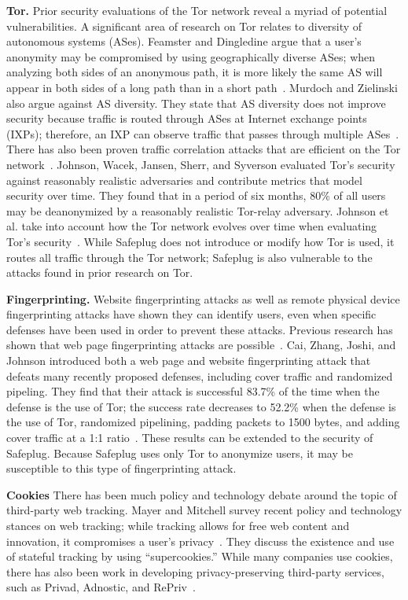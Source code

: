 \documentclass[conference]{IEEEtran}
\begin{document}
{\bf Tor.} Prior security evaluations of the Tor network reveal a myriad of potential vulnerabilities.  A significant area of research on Tor relates to diversity of autonomous systems (ASes).  Feamster and Dingledine argue that a user's anonymity may be compromised by using geographically diverse ASes; when analyzing both sides of an anonymous path, it is more likely the same AS will appear in both sides of a long path than in a short path~\cite{feamster}.  Murdoch and Zielinski also argue against AS diversity.  They state that AS diversity does not improve security because traffic is routed through ASes at Internet exchange points (IXPs); therefore, an IXP can observe traffic that passes through multiple ASes~\cite{murdoch2}.  There has also been proven traffic correlation attacks that are efficient on the Tor network~\cite{murdoch, overlier}.  Johnson, Wacek, Jansen, Sherr, and Syverson evaluated Tor's security against reasonably realistic adversaries and contribute metrics that model security over time.  They found that in a period of six months, 80\% of all users may be deanonymized by a reasonably realistic Tor-relay adversary.  Johnson et al. take into account how the Tor network evolves over time when evaluating Tor's security~\cite{tor2}.  While Safeplug does not introduce or modify how Tor is used, it routes all traffic through the Tor network; Safeplug is also vulnerable to the attacks found in prior research on Tor.  

{\bf Fingerprinting.}  Website fingerprinting attacks as well as remote physical device fingerprinting attacks have shown they can identify users, even when specific defenses have been used in order to prevent these attacks. Previous research has shown that web page fingerprinting attacks are possible~\cite{dyer, herrmann, panchenko}.  Cai, Zhang, Joshi, and Johnson introduced both a web page and website fingerprinting attack that defeats many recently proposed defenses, including cover traffic and randomized pipeling.  They find that their attack is successful 83.7\% of the time when the defense is the use of Tor; the success rate decreases to 52.2\% when the defense is the use of Tor, randomized pipelining, padding packets to 1500 bytes, and adding cover traffic at a 1:1 ratio~\cite{fingerprint1}.  These results can be extended to the security of Safeplug.  Because Safeplug uses only Tor to anonymize users, it may be susceptible to this type of fingerprinting attack.

{\bf Cookies} There has been much policy and technology debate around the topic of third-party web tracking.  Mayer and Mitchell survey recent policy and technology stances on web tracking; while tracking allows for free web content and innovation, it compromises a user's privacy~\cite{commercial2}.  They discuss the existence and use of stateful tracking by using ``supercookies.''  While many companies use cookies, there has also been work in developing privacy-preserving third-party services, such as Privad, Adnostic, and RePriv~\cite{guha, toubiana, fredrikson}.
\end{document}
